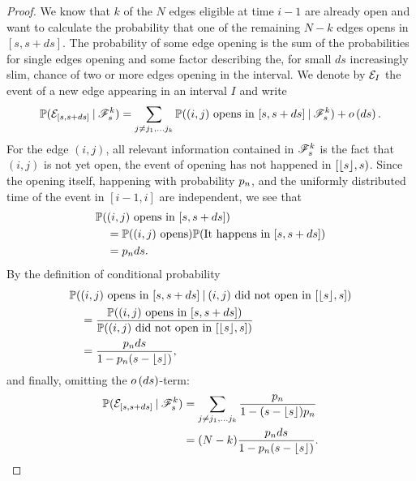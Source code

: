 \begin{proof}
	We know that $k$ of the $N$ edges eligible at time $i-1$ are already open 
	and want to calculate the probability that one of the remaining $N-k$ edges opens in $[s, s+ds]$.
	The probability of some edge opening is the sum of the probabilities for single edges opening
	and some factor describing the, for small $ds$ increasingly slim, 
	chance of two or more edges opening in the interval.
	We denote by $\mathcal{E}_{I}$ the event of a new edge appearing in an interval $I$ and write
	\begin{equation}
	\mathbb{P}(\mathcal{E}_{[s,s+ds]} \: | \: \mathscr{F}_s^k)
	= \sum_{j \neq j_1, \dots j_k} \mathbb{P}( \text{$(i,j)$ opens in $[s, s+ds]$} \: | \: \mathscr{F}_s^k ) + o\left(ds\right).
	\end{equation}
	For the edge $(i,j)$, all relevant information contained in $\mathscr{F}_s^k$ is the fact that 
	$(i,j)$ is not yet open, the event of opening has not happened in $[\lfloor s\rfloor, s)$.
	Since the opening itself, happening with probability $p_n$,
	and the uniformly distributed time of the event in $[i-1, i]$ are independent,
	we see that
	\begin{equation}
	\begin{aligned}
	&\mathbb{P}(\text{$(i,j)$ opens in $[s, s+ds]$}) \\
	&\quad = \mathbb{P}(\text{$(i,j)$ opens})\mathbb{P}(\text{It happens in $[s, s+ds]$}) \\
	&\quad = p_n ds.
	\end{aligned}
	\end{equation}
	By the definition of conditional probability
	\begin{equation}
	\begin{aligned}
	&\mathbb{P}( \text{$(i,j)$ opens in $[s, s+ds]$} \: | \: \text{$(i,j)$ did not open in $[\lfloor s\rfloor, s]$} ) \\
	&\quad = \frac{\mathbb{P}( \text{$(i,j)$ opens in $[s, s+ds]$})}{\mathbb{P}(\text{$(i,j)$ did not open in $[\lfloor s\rfloor, s]$})} \\
	&\quad = \frac{p_n ds}{1-p_n(s-\lfloor s\rfloor)},
	\end{aligned}
	\end{equation}
	and finally, omitting the $o\left(ds\right)$-term:
	\begin{equation}
	\begin{aligned}
	\Prob(\NewEdge{[s,s+ds]} \cond \SigmaAlgebra_s^k) 
	&= \sum_{j \neq j_1, \dots j_k} \ps \\
	&= (N-k) \frac{\p ds}{1-\p(s-\floor{s})}.
	\end{aligned}

\end{equation}
\end{proof}
